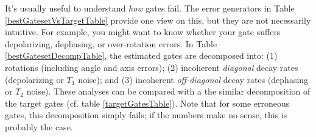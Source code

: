 \documentclass{article}[11pt]
\begin{document}
It's usually useful to understand \emph{how} gates fail.  The error generators in Table \ref{bestGatesetVsTargetTable} provide one view on this, but they are not necessarily intuitive.   For example, you might want to know whether your gate suffers depolarizing, dephasing, or over-rotation errors.  In Table \ref{bestGatesetDecompTable}, the estimated gates are decomposed into: (1) rotations (including angle and axis errors); (2) incoherent \emph{diagonal} decay rates (depolarizing or $T_1$ noise); and (3) incoherent \emph{off-diagonal} decay rates (dephasing or $T_2$ noise).  These analyses can be compared with a the similar decomposition of the target gates (cf. table \ref{targetGatesTable}).  Note that for some erroneous gates, this decomposition simply fails; if the numbers make no sense, this is probably the case.
\end{document}

